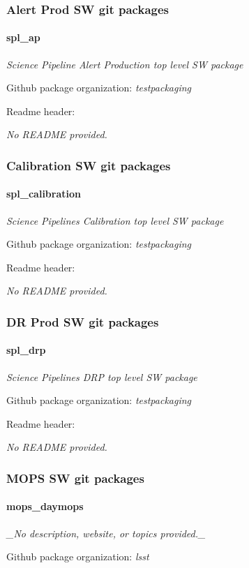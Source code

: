 \subsubsection{Alert Prod SW git packages}
\paragraph{spl\_ap}
\textit{Science Pipeline Alert Production top level SW package}

Github package organization: \textit{testpackaging}

Readme header:

\textit{No README provided.}

\subsubsection{Calibration SW git packages}
\paragraph{spl\_calibration}
\textit{Science Pipelines Calibration top level SW package}

Github package organization: \textit{testpackaging}

Readme header:

\textit{No README provided.}

\subsubsection{DR Prod SW git packages}
\paragraph{spl\_drp}
\textit{Science Pipelines DRP top level SW package}

Github package organization: \textit{testpackaging}

Readme header:

\textit{No README provided.}

\subsubsection{MOPS SW git packages}
\paragraph{mops\_daymops}
\textit{\_No description, website, or topics provided.\_}

Github package organization: \textit{lsst}


